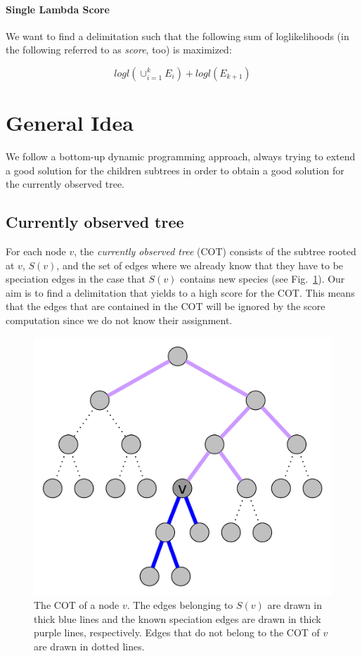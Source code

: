 \documentclass{llncs}
\begin{document}
\paragraph{Single Lambda Score}

We want to find a delimitation such that the following sum of loglikelihoods (in the following referred to as \emph{score}, too) is maximized:

$$logl(\cup_{i=1}^k{E_i}) + logl(E_{k+1})$$

\section{General Idea}

We follow a bottom-up dynamic programming approach, always trying to extend a good solution for the children subtrees in order to obtain a good solution for the currently observed tree.

\subsection{Currently observed tree}

For each node $v$, the \emph{currently observed tree} (COT) consists of the subtree rooted at $v$, $S(v)$, and the set of edges where we already know that they have to be speciation edges in the case that $S(v)$ contains new species (see Fig.~\ref{fig:currently_observed_tree}). Our aim is to find a delimitation that yields to a high score for the COT. This means that the edges that are contained in the COT will be ignored by the score computation since we do not know their assignment.

\begin{figure}[h!]
	\centering
	\includegraphics[scale=0.4]{images/currently_observed_tree.pdf}
	\caption{The COT of a node $v$. The edges belonging to $S(v)$ are drawn in thick blue lines and the known speciation edges are drawn in thick purple lines, respectively. Edges that do not belong to the COT of $v$ are drawn in dotted lines.}
	\label{fig:currently_observed_tree}
\end{figure}
\end{document}
